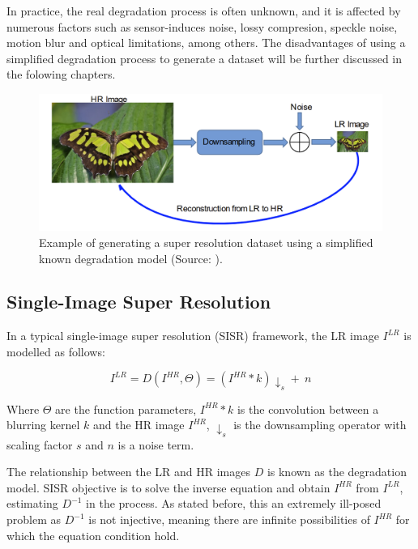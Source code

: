     In practice, the real degradation process is often unknown, and it is affected by numerous factors such as sensor-induces noise, lossy compresion, speckle noise, motion blur and optical limitations, among others.
    The disadvantages of using a simplified degradation process to generate a dataset will be further discussed in the folowing chapters.

    \begin{figure}[H]
        \centering
        \includegraphics[width=\textwidth]{Includes/3-super-resolution-data.png}
        \caption{Example of generating a super resolution dataset using a simplified known degradation model (Source: \cite{bashir2021comprehensive}).}
        \label{fig:3-super-resolution-data}
    \end{figure}

    

    \subsection{Single-Image Super Resolution}

        In a typical single-image super resolution (SISR) framework, the LR image $I^{LR}$ is modelled as follows:
    
        \begin{equation}
            I^{LR} = D(I^{HR},\Theta) = ( I^{HR} \ast k) \downarrow_s + \ n
            \label{eq:2-degradation-equation}
        \end{equation}
    
        Where $\Theta$ are the function parameters, $I^{HR} \ast k$ is the convolution between a blurring kernel $k$ and the  HR image  $I^{HR}$, $\downarrow_s$ is the downsampling operator with scaling factor $s$ and $n$ is a noise term.
        
        The relationship between the LR and HR images $D$ is known as the degradation model.
        SISR objective is to solve the inverse equation and obtain $I^{HR}$ from $I^{LR}$, estimating $D^{-1}$ in the process. As stated before, this an extremely ill-posed problem as $D^{-1}$ is not injective, meaning there are infinite possibilities of $I^{HR}$ for which the equation condition hold. 

